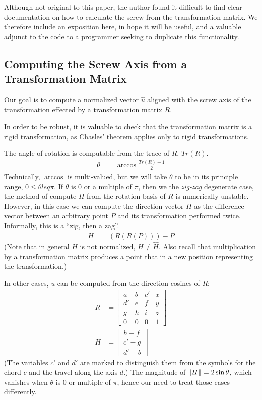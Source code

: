 \documentclass[11pt]{article}
\DeclarePairedDelimiter{\norm}{\lVert}{\rVert}
\begin{document}
{Although not original to this paper, the author found it
difficult to find clear documentation on how to calculate the
screw from the transformation matrix.
We therefore include an exposition here, in hope it will be useful,
and a valuable adjunct to the code to a programmer seeking to duplicate
this functionality.

\subsection{Computing the Screw Axis from a Transformation Matrix}

Our goal is to compute a normalized vector $\hat{u}$ aligned with the screw
axis of the transformation effected by a transformation matrix $R$.

In order to be robust, it is valuable to check that the transformation
matrix is a rigid transformation\cite{wiki:rigid},
as Chasles' theorem applies only to rigid transformations.

The angle of rotation is computable from the trace of $R$, $Tr(R)$.
\begin{align}
  \theta &= \arccos{\frac{Tr(R) - 1}{2}}
\end{align}
Technically, $\arccos$ is multi-valued, but we will take $\theta$
to be in its principle range, $0 \leq \theta leq \pi$.
If $\theta$ is $0$ or a multiple of $\pi$, then we the {\em zig-zag}
degenerate case, the method of compute $H$ from the rotation
basis of $R$ is numerically unstable. However, in this case
we can compute the direction vector $H$ as the difference vector
between an arbitrary point $P$ and its transformation performed
twice. Informally, this is a ``zig, then a zag''.
\begin{align}
  H &= (R ( R( P))) - P
\end{align}
(Note that in general $H$ is not normalized, $H \neq \hat{H}$.
Also recall that multiplication by a transformation matrix
produces a point that in a new position representing
the transformation.)

In other cases, $u$ can be computed from the direction
cosines of $R$\cite{wiki:rotation}:
\begin{align}
  R &=     \begin{bmatrix} a & b & c' & x \\ d' & e & f & y\\ g & h & i & z\\ 0 &  0 & 0 & 1\end{bmatrix} \\
    H &=  \begin{bmatrix} h - f \\ c' - g \\ d' - b  \end{bmatrix}
\end{align}
(The variables $c'$ and $d'$ are marked to distinguish them from
the symbols for the chord $c$ and the travel along the axis $d$.)
The magnitude of $\norm{H} = 2 \sin{\theta}$, which vanishes
when $\theta$ is $0$ or multiple of $\pi$, hence our need
to treat those cases differently.

}
\end{document}
